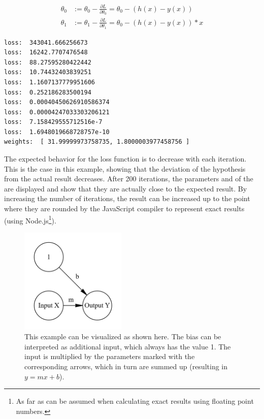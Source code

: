 \begin{equation}
    \begin{split}
        \theta_{0} & := \theta_{0} - \frac{\partial L}{\partial \theta_{0}} =
        \theta_{0} - (h(x) - y(x))  \\
        \theta_{1} & := \theta_{1} - \frac{\partial L}{\partial \theta_{1}} =
        \theta_{0} - (h(x) - y(x)) * x
    \end{split}
    \label{eq:sgd_mse_here}
\end{equation}

\begin{lstlisting}[caption={Output of C to F converter.}]
loss:  343041.666256673
loss:  16242.7707476548
loss:  88.27595280422442
loss:  10.74432403839251
loss:  1.1607137779951606
loss:  0.252186283500194
loss:  0.00040450626910586374
loss:  0.00004247033303206121
loss:  7.158429555712516e-7
loss:  1.6948019668728757e-10
weights:  [ 31.99999973758735, 1.8000003977458756 ]
\end{lstlisting} 

The expected behavior for the loss function is to decrease with each iteration.
This is the case in this example, showing that the deviation of the hypothesis from the actual result decreases.
After 200 iterations, the parameters  and  of the  are displayed and show that they are actually close to the expected result.
By increasing the number of iterations, the result can be increased up to the point where they are rounded by the JavaScript compiler to represent exact results (using Node.js\footnote{As far as can be assumed when calculating exact results using floating point numbers.}).

\begin{figure}
    \centering
    \caption[Simplest model]{This example can be visualized as shown here. The bias can be interpreted as additional input, which always has the value 1. The input is multiplied by the parameters marked with the corresponding arrows, which in turn are summed up (resulting in $y = mx + b$).}
    \includegraphics[width=0.45\textwidth]{images/1_simplest_nn.png}
\end{figure} 

